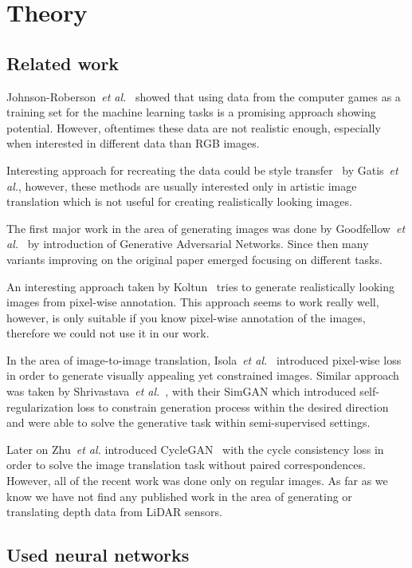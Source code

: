 \chapter{Theory}

\section{Related work}

Johnson-Roberson~{\em et al.}~\cite{matrix} showed that using data from the computer games as a training set for the machine learning tasks is a promising approach showing potential. However, oftentimes these data are not realistic enough, especially when interested in different data than RGB images.

Interesting approach for recreating the data could be style transfer~\cite{artstyle} by Gatis~{\em et al.}, however, these methods are usually interested only in artistic image translation which is not useful for creating realistically looking images.

The first major work in the area of generating images was done by Goodfellow~{\em et al.}~\cite{origgan} by introduction of Generative Adversarial Networks. Since then many variants improving on the original paper emerged focusing on different tasks.

An interesting approach taken by Koltun~\cite{koltun} tries to generate realistically looking images from pixel-wise annotation. This approach seems to work really well, however, is only suitable if you know pixel-wise annotation of the images, therefore we could not use it in our work.

In the area of image-to-image translation, Isola~{\em et al.}~\cite{pix2pix} introduced pixel-wise loss in order to generate visually appealing yet constrained images. Similar approach was taken by Shrivastava~{\em et al.}~\cite{historypool}, with their SimGAN which introduced self-regularization loss to constrain generation process within the desired direction and were able to solve the generative task within semi-supervised settings.

Later on Zhu~{\em et al.} introduced CycleGAN~\cite{cyclegan} with the cycle consistency loss in order to solve the image translation task without paired correspondences. However, all of the recent work was done only on regular images. As far as we know we have not find any published work in the area of generating or translating depth data from LiDAR sensors.

\section{Used neural networks} \label{nets}

